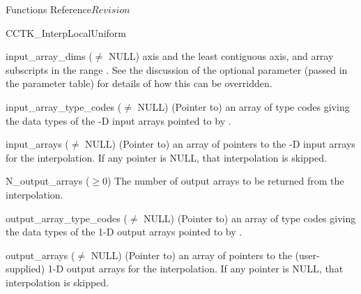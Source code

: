 \begin{cactuspart}{ Functions Reference}{}{$Revision$}
\begin{FunctionDescription}{CCTK\_InterpLocalUniform}
\begin{ParameterSection}
\begin{Parameter}{input\_array\_dims ($\ne$ NULL)}
axis and \code{[N\_dims-1]} the least contiguous axis, and array subscripts
in the range .  See the
discussion of the  optional parameter (passed
in the parameter table) for details of how this can be overridden.
\end{Parameter}
\begin{Parameter}{input\_array\_type\_codes ($\ne$ NULL)}
\hbox{}
(Pointer to) an array of  
type codes giving the data types of the -D input arrays
pointed to by .
\end{Parameter}
\begin{Parameter}{input\_arrays ($\ne$ NULL)}
\hbox{}
(Pointer to) an array of  pointers to the
-D input arrays for the interpolation.  If any
 pointer is NULL, that interpolation is skipped.
\end{Parameter}
\begin{Parameter}{N\_output\_arrays ($\ge 0$)}
\hbox{}
The number of output arrays to be returned from the interpolation.
\end{Parameter}
\begin{Parameter}{output\_array\_type\_codes ($\ne$ NULL)}
\hbox{}
(Pointer to) an array of  
type codes giving the data types of the 1-D output arrays pointed to by
.
\end{Parameter}
\begin{Parameter}{output\_arrays ($\ne$ NULL)}
\hbox{}
(Pointer to) an array of  pointers to the
(user-supplied) 1-D output arrays for the interpolation.  If any
 pointer is NULL, that interpolation is skipped.
\end{Parameter}
\end{ParameterSection}


\end{FunctionDescription}
\end{cactuspart}
